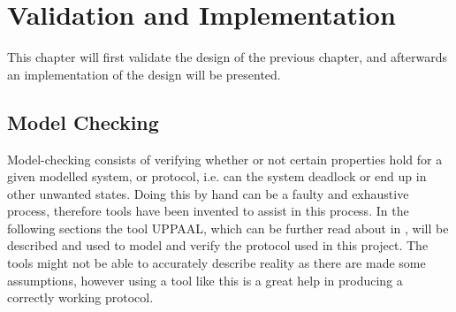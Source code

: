 \chapter{Validation and Implementation}\label{cha:validationAndImplementation}
This chapter will first validate the design of the previous chapter, and afterwards an implementation of the design will be presented.

\section{Model Checking}

Model-checking consists of verifying whether or not certain properties hold for a given modelled system, or protocol, i.e. can the system deadlock or end up in other unwanted states.
Doing this by hand can be a faulty and exhaustive process, therefore tools have been invented to assist in this process. In the following sections the tool UPPAAL, which can be further read about in \cite{UPPAAL}, will be described and used to model and verify the protocol used in this project. 
The tools might not be able to accurately describe reality as there are made some assumptions, however using a tool like this is a great help in producing a correctly working protocol. 



